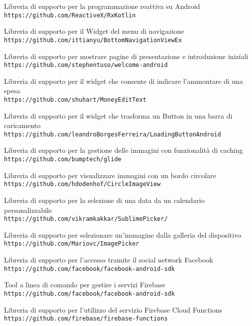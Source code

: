 \begin{thebibliography}{9}
Libreria di supporto per la programmazione reattiva su Android
\\\texttt{https://github.com/ReactiveX/RxKotlin}

Libreria di supporto per il Widget del menu di navigazione
\\\texttt{https://github.com/ittianyu/BottomNavigationViewEx}

Libreria di supporto per mostrare pagine di presentazione e introduzione iniziali
\\\texttt{https://github.com/stephentuso/welcome-android}

Libreria di supporto per il widget che consente di indicare l'ammontare di una spesa
\\\texttt{https://github.com/shuhart/MoneyEditText}

Libreria di supporto per il widget che trasforma un Button in una barra di caricamento
\\\texttt{https://github.com/leandroBorgesFerreira/LoadingButtonAndroid}

Libreria di supporto per la gestione delle immagini con funzionalità di caching
\\\texttt{https://github.com/bumptech/glide}

Libreria di supporto per visualizzare immagini con un bordo circolare
\\\texttt{https://github.com/hdodenhof/CircleImageView}

Libreria di supporto per la selezione di una data da un calendario personalizzabile
\\\texttt{https://github.com/vikramkakkar/SublimePicker/}

Libreria di supporto per selezionare un'immagine dalla galleria del dispositivo
\\\texttt{https://github.com/Mariovc/ImagePicker}

Libreria di supporto per l'accesso tramite il social network Facebook
\\\texttt{https://github.com/facebook/facebook-android-sdk}


Tool a linea di comando per gestire i servizi Firebase
\\\texttt{https://github.com/facebook/facebook-android-sdk}


Libreria di supporto per l'utilizzo del servizio Firebase Cloud Functions
\\\texttt{https://github.com/firebase/firebase-functions}




\end{thebibliography}

